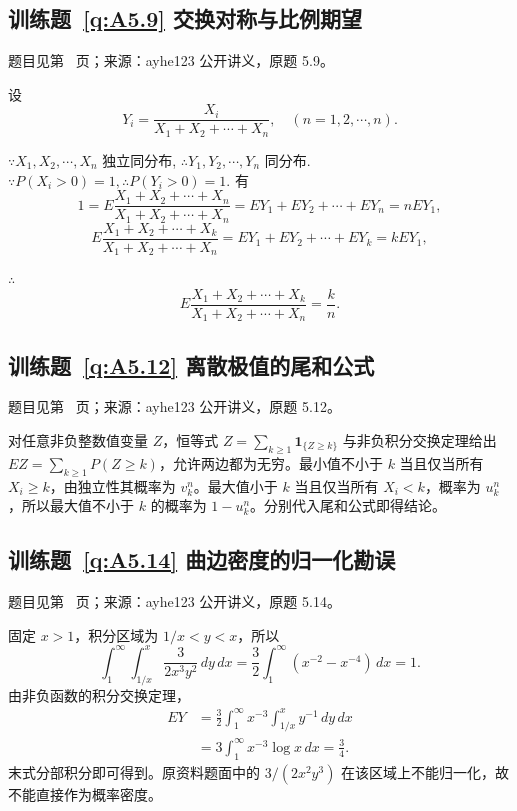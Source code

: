 \subsection*{训练题~\ref{q:A5.9} 交换对称与比例期望}\label{a:A5.9}{\small 题目见第~\pageref{q:A5.9} 页；来源：ayhe123 公开讲义，原题 5.9。}
\begin{solve}
    设
    \[Y_i=\dfrac{X_i}{X_1+X_2+\cdots+X_n},\quad (n=1,2,\cdots,n).\]
    
    $\because X_1,X_2,\cdots,X_n$ 独立同分布, $\therefore Y_1,Y_2,\cdots,Y_n$ 同分布. $\because P(X_i>0)=1,\therefore P(Y_i>0)=1$. 有
    \[1=E\dfrac{X_1+X_2+\cdots+X_n}{X_1+X_2+\cdots+X_n}=EY_1+EY_2+\cdots+EY_n=nEY_1,\]
    \[E\dfrac{X_1+X_2+\cdots+X_k}{X_1+X_2+\cdots+X_n}=EY_1+EY_2+\cdots+EY_k=kEY_1,\]

    $\therefore$
    \[E\dfrac{X_1+X_2+\cdots+X_k}{X_1+X_2+\cdots+X_n}=\dfrac{k}{n}.\]
\end{solve}

\subsection*{训练题~\ref{q:A5.12} 离散极值的尾和公式}\label{a:A5.12}{\small 题目见第~\pageref{q:A5.12} 页；来源：ayhe123 公开讲义，原题 5.12。}
\begin{solve}对任意非负整数值变量 $Z$，恒等式 $Z=\sum_{k\ge1}\mathbf1_{\{Z\ge k\}}$ 与非负积分交换定理给出 $EZ=\sum_{k\ge1}P(Z\ge k)$，允许两边都为无穷。最小值不小于 $k$ 当且仅当所有 $X_i\ge k$，由独立性其概率为 $v_k^n$。最大值小于 $k$ 当且仅当所有 $X_i<k$，概率为 $u_k^n$，所以最大值不小于 $k$ 的概率为 $1-u_k^n$。分别代入尾和公式即得结论。\end{solve}

\subsection*{训练题~\ref{q:A5.14} 曲边密度的归一化勘误}\label{a:A5.14}{\small 题目见第~\pageref{q:A5.14} 页；来源：ayhe123 公开讲义，原题 5.14。}
\begin{solve}固定 $x>1$，积分区域为 $1/x<y<x$，所以\[\int_1^\infty\!\int_{1/x}^{x}\frac{3}{2x^3y^2}\,dy\,dx=\frac32\int_1^\infty(x^{-2}-x^{-4})\,dx=1.\]由非负函数的积分交换定理，\[\begin{aligned}EY&=\frac32\int_1^\infty x^{-3}\!\int_{1/x}^x y^{-1}\,dy\,dx\\&=3\int_1^\infty x^{-3}\log x\,dx=\frac34.\end{aligned}\]末式分部积分即可得到。原资料题面中的 $3/(2x^2y^3)$ 在该区域上不能归一化，故不能直接作为概率密度。\end{solve}

